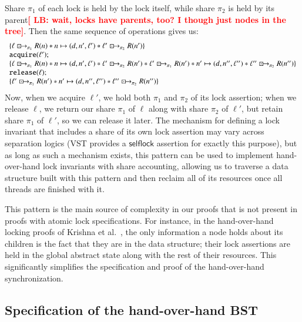 \documentclass[runningheads]{llncs}
\newcommand{\LB}[1]{\textbf{\textcolor{red}{[ LB: #1]}}}
\newcommand{\islock}{\boxdotright}
\begin{document}
Share $\pi_1$ of each lock is held by the lock itself, while share $\pi_2$ is held by its parent\LB{wait, locks have parents, too? I though just nodes in the tree}. Then the same sequence of operations gives us:
$$\begin{array}{l}
\{ \ell \islock_{\pi_1} R(n) * n \mapsto (d, n', \ell') * \ell' \islock_{\pi_2} R(n') \}\\
\texttt{acquire}(\ell');\\
\{ \ell \islock_{\pi_1} R(n) * n \mapsto (d, n', \ell') * \ell' \islock_{\pi_2} R(n') * \ell' \islock_{\pi_1} R(n') * n' \mapsto (d, n'', \ell'') * \ell'' \islock_{\pi_2} R(n'') \}\\
\texttt{release}(\ell);\\
\{ \ell' \islock_{\pi_1} R(n') * n' \mapsto (d, n'', \ell'') * \ell'' \islock_{\pi_2} R(n'') \}
\end{array}$$
Now, when we acquire $\ell'$, we hold both $\pi_1$ and $\pi_2$ of its lock assertion; when we release $\ell$, we return our share $\pi_1$ of $\ell$ along with share $\pi_2$ of $\ell'$, but retain share $\pi_1$ of $\ell'$, so we can release it later. The mechanism for defining a lock invariant that includes a share of its own lock assertion may vary across separation logics (VST provides a $\mathsf{selflock}$ assertion for exactly this purpose), but as long as such a mechanism exists, this pattern can be used to implement hand-over-hand lock invariants with share accounting, allowing us to traverse a data structure built with this pattern and then reclaim all of its resources once all threads are finished with it.

This pattern is the main source of complexity in our proofs that is not present in proofs with atomic lock specifications. For instance, in the hand-over-hand locking proofs of Krishna et al.~\cite{templates}, the only information a node holds about its children is the fact that they are in the data structure; their lock assertions are held in the global abstract state along with the rest of their resources. This significantly simplifies the specification and proof of the hand-over-hand synchronization.

\subsection{Specification of the hand-over-hand BST}
\end{document}
